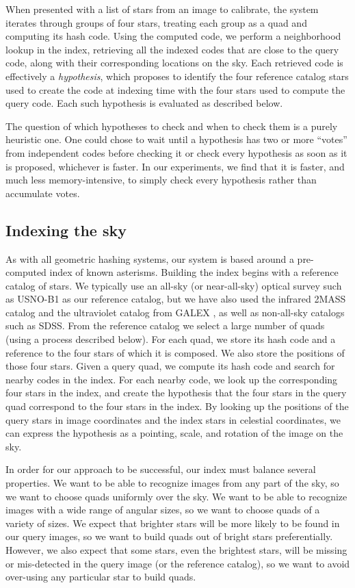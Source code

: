 When presented with a list of stars from an image to calibrate, the
system iterates through groups of four stars, treating each group as a
quad and computing its hash code.  Using the computed code, we perform
a neighborhood lookup in the index, retrieving all the indexed codes
that are close to the query code, along with their corresponding
locations on the sky.  Each retrieved code is effectively a
\emph{hypothesis}, which proposes to identify the four reference
catalog stars used to create the code at indexing time with the four
stars used to compute the query code. Each such hypothesis is
evaluated as described below.


The question of which hypotheses to check and when to check them is a
purely heuristic one. One could chose to wait until a hypothesis has
two or more ``votes'' from independent codes before checking it or
check every hypothesis as soon as it is proposed, whichever is faster.
In our experiments, we find that it is faster, and much less
memory-intensive, to simply check every hypothesis rather than
accumulate votes.


\subsection{Indexing the sky}


As with all geometric hashing systems, our system is based around a
pre-computed index of known asterisms.  Building the index begins with
a reference catalog of stars.  We typically use an all-sky (or
near-all-sky) optical survey such as USNO-B1 \cite{usnob,
barroncleaning} as our reference catalog, but we have also used the
infrared 2MASS catalog \cite{twomass} and the ultraviolet catalog from
GALEX \cite{galex}, as well as non-all-sky catalogs such as SDSS.
From the reference catalog we select a large number of quads (using a
process described below).  For each quad, we store its hash code and a
reference to the four stars of which it is composed.  We also store
the positions of those four stars.  Given a query quad, we compute its
hash code and search for nearby codes in the index.  For each nearby
code, we look up the corresponding four stars in the index, and create
the hypothesis that the four stars in the query quad correspond to the
four stars in the index.  By looking up the positions of the query
stars in image coordinates and the index stars in celestial
coordinates, we can express the hypothesis as a pointing, scale, and
rotation of the image on the sky.


In order for our approach to be successful, our index must balance
several properties.  We want to be able to recognize images from any
part of the sky, so we want to choose quads uniformly over the sky.
We want to be able to recognize images with a wide range of angular
sizes, so we want to choose quads of a variety of sizes.  We expect
that brighter stars will be more likely to be found in our query
images, so we want to build quads out of bright stars preferentially.
However, we also expect that some stars, even the brightest stars,
will be missing or mis-detected in the query image (or the reference
catalog), so we want to avoid over-using any particular star to build
quads.


